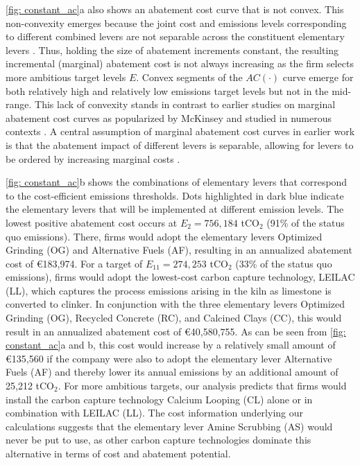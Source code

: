 \documentclass[12pt, a4paper]{article} %
\begin{document}
\autoref{fig: constant_ac}a also shows an abatement cost curve that is not convex. This non-convexity emerges because the joint cost and emissions levels corresponding to different combined levers are not separable across the constituent elementary levers \citep{kesicki2012marginal,Vogt-Schilb2014marginal,mckitrick1999a,ward2014the}. Thus, holding the size of abatement increments constant, the resulting incremental  (marginal) abatement cost is not always increasing as the firm selects more ambitious target levels $E$. Convex segments of the $AC(\cdot)$ curve emerge for both relatively high and relatively low emissions target levels but not in the mid-range. This lack of convexity stands in contrast to earlier studies on marginal abatement cost curves as popularized by McKinsey \citep{mckinsey2007a} and studied in numerous contexts \citep{harmsen2019long,jiang2020the,huang2016the,lameh2022on,misconel2022model}. A central assumption of marginal abatement cost curves in earlier work is that the abatement impact of different levers is separable, allowing for levers to be ordered by increasing marginal costs \citep{kuosmanen2021shadow,baker2008technical,beaumont2004abatement}.

\autoref{fig: constant_ac}b shows the combinations of elementary levers that correspond to the cost-efficient emissions thresholds. Dots highlighted in dark blue indicate the elementary levers that will be implemented at different emission levels. The lowest positive abatement cost occurs at $E_2 = 756,184$ tCO$_2$ (91\% of the status quo emissions). There, firms would adopt the elementary levers Optimized Grinding (OG) and Alternative Fuels (AF), resulting in an annualized abatement cost of \euro 183,974. For a target of $E_{11} = 274,253$ tCO$_2$ (33\% of the status quo emissions), firms would adopt the lowest-cost carbon capture technology, LEILAC (LL), which captures the process emissions arising in the kiln as limestone is converted to clinker. In conjunction with the three elementary levers Optimized Grinding (OG), Recycled Concrete (RC), and Calcined Clays (CC), this would result in an annualized abatement cost of \euro 40,580,755. As can be seen from \autoref{fig: constant_ac}a and b, this cost would increase by a relatively small amount of \euro 135,560 if the company were also to adopt the elementary lever Alternative Fuels (AF) and thereby lower its annual emissions by an additional amount of 25,212 tCO$_2$. For more ambitious targets, our analysis predicts that firms would install the carbon capture technology Calcium Looping (CL) alone or in combination with LEILAC (LL). The cost information underlying our calculations suggests that the elementary lever Amine Scrubbing (AS) would never be put to use, as other carbon capture technologies dominate this alternative in terms of cost and abatement potential.
\end{document}
